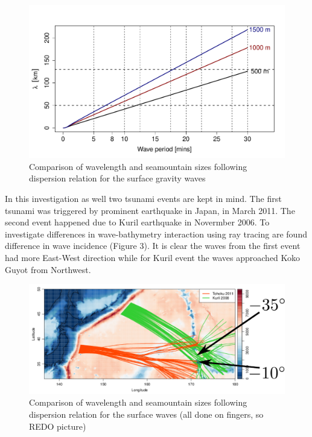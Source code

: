 \begin{figure}
\includegraphics[scale=0.5]{../figures/tsunami_regimes.pdf}
\caption{Comparison of wavelength and seamountain sizes following dispersion relation for the surface gravity waves}
\end{figure}

In this investigation as well two tsunami events are kept in mind. The first tsunami was triggered by prominent earthquake in Japan, in March 2011. The second event happened due to Kuril earthquake in Novermber 2006. To investigate differences in wave-bathymetry interaction using ray tracing are found difference in wave incidence (Figure 3). It is clear the waves from the first event had more East-West direction while for Kuril event the waves approached Koko Guyot from Northwest.
\begin{figure}
\includegraphics[scale=0.5]{../figures/koko_rays.pdf}
\caption{Comparison of wavelength and seamountain sizes following dispersion relation for the surface waves (all done on fingers, so REDO picture)}
\end{figure}

\newpage


